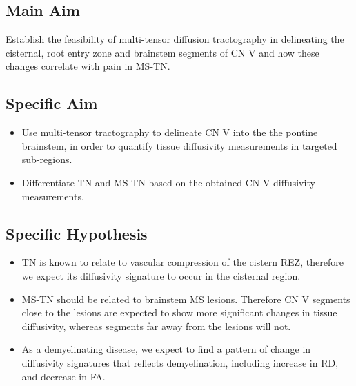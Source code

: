 \subsection{Main Aim} 
Establish the feasibility of multi-tensor diffusion tractography in delineating the cisternal, root entry zone and brainstem segments of CN V and how these changes correlate with pain in MS-TN.

\subsection{Specific Aim}
\begin{itemize}
    \item Use multi-tensor tractography to delineate CN V into the the pontine brainstem, in order to quantify tissue diffusivity measurements in targeted sub-regions.
    \item Differentiate TN and MS-TN based on the obtained CN V diffusivity measurements.
\end{itemize}

\subsection{Specific Hypothesis}
\begin{itemize}
    \item TN is known to relate to vascular compression of the cistern REZ, therefore we expect its diffusivity signature to occur in the cisternal region.
    \item MS-TN should be related to brainstem MS lesions. Therefore CN V segments close to the lesions are expected to show more significant changes in tissue diffusivity, whereas segments far away from the lesions will not. 
    \item As a demyelinating disease, we expect to find a pattern of change in diffusivity signatures that reflects demyelination, including increase in RD, and decrease in FA. 
\end{itemize}

